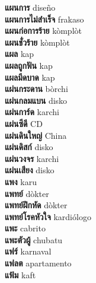 \textbf{ แผนการ  } diseño \\
\textbf{ แผนการไม่สำเร็จ  } frakaso \\
\textbf{ แผนก่อการร้าย  } kòmplòt \\
\textbf{ แผนชั่วร้าย  } kòmplòt \\
\textbf{ แผล  } kap \\
\textbf{ แผลถูกฟัน  } kap \\
\textbf{ แผลมีดบาด  } kap \\
\textbf{ แผ่นกระดาน  } bòrchi \\
\textbf{ แผ่นกลมแบน  } disko \\
\textbf{ แผ่นการ์ด  } karchi \\
\textbf{ แผ่นซีดี  } CD \\
\textbf{ แผ่นดินใหญ่  } China \\
\textbf{ แผ่นดิสก์  } disko \\
\textbf{ แผ่นวงจร  } karchi \\
\textbf{ แผ่นเสียง  } disko \\
\textbf{ แพง  } karu \\
\textbf{ แพทย์  } dòkter \\
\textbf{ แพทย์ฝึกหัด  } dòkter \\
\textbf{ แพทย์โรคหัวใจ  } kardiólogo \\
\textbf{ แพะ  } cabrito \\
\textbf{ แพะตัวผู้  } chubatu \\
\textbf{ แฟร์  } karnaval \\
\textbf{ แฟลต  } apartamento \\
\textbf{ แฟ้ม  } kaft \\
